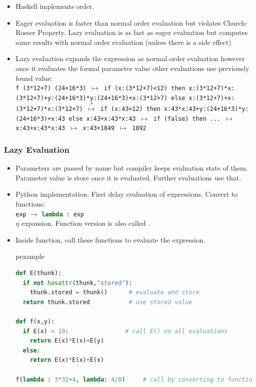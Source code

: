 \begin{frame}
\begin{itemize}
\item Haskell implements  order.
\item Eager evaluation is faster than normal order evaluation but violates Church-Rosser
Property. Lazy evaluation is as fast as eager evaluation but computes same results with normal
order evaluation (unless there is a side effect)
\item Lazy evaluation expands the expression as normal order evaluation however once it
evaluates the formal parameter value other evaluations use previously found value:\\
\texttt{\scriptsize f (3*12+7) (24+16*3) $\mapsto$
	  if (x:(3*12+7)<12) then x:(3*12+7)*x:(3*12+7)+y:(24+16*3)*y:(24+16*3)+x:(3*12+7) 
                  else x:(3*12+7)+x:(3*12+7)*x:(3*12+7) $\stackrel{*}{\mapsto}$
	if (x:43<12) then x:43*x:43+y:(24+16*3)*y:(24+16*3)+x:43
                  else x:43+x:43*x:43 $\mapsto$ if (false) then ... $\mapsto$ x:43+x:43*x:43
	$\mapsto$ x:43+1849 $\mapsto$ 1892}\hfill {}
	

\end{itemize}
\end{frame}

\begin{frame}[fragile]
\frametitle{Lazy Evaluation}
\small
\begin{itemize}
\item Parameters are passed by name but compiler keeps evaluation state of them. Parameter value is store once it is evaluated. Further evaluations use that.
\item Python implementation. First delay evaluation of expressions. Convert to functions:\\
\lstinline!exp! $\rightarrow$ \lstinline[language=Python]!lambda : exp! \\
$\eta$ expansion. Function version is also called .
\item Inside function, call these functions to evaluate the expression.
\begin{beamercolorbox}{pexample}
\begin{lstlisting}[language=Python,basicstyle=\tiny\tt]
def E(thunk):
  if not hasattr(thunk,"stored"):
    thunk.stored = thunk()      # evaluate and store
  return thunk.stored           # use stored value

def f(x,y):
  if E(x) < 10:                # call E() on all evaluations
    return E(x)*E(x)+E(y)
  else:
    return E(x)*E(x)+E(x)

f(lambda : 3*32+4, lambda: 4/0)     # call by converting to function
\end{lstlisting}
\end{beamercolorbox}
\end{itemize}
\end{frame}

